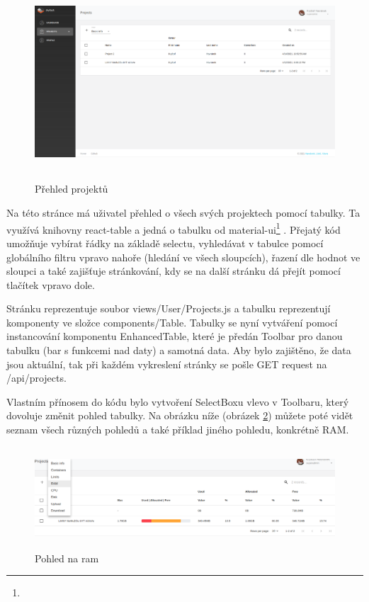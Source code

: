 \documentclass[a4paper,oneside,12pt]{report}
\begin{document}
\begin{figure}[h]
	\centering
	\includegraphics[height=7.3cm]{../img/projectsOverview.png}
	\caption[Přehled projektů, vlastní tvorba]{Přehled projektů}
	\label{fig:projectOverview}
\end{figure}


Na této stránce má uživatel přehled o všech svých projektech pomocí tabulky.
Ta využívá knihovny react-table a jedná o tabulku od material-ui\footnote{} .
Přejatý kód umožňuje vybírat řádky na základě selectu, vyhledávat v tabulce pomocí globálního filtru vpravo nahoře (hledání ve všech sloupcích), řazení dle hodnot ve sloupci a také zajišťuje stránkování, kdy se na další stránku dá přejít pomocí tlačítek vpravo dole.

Stránku reprezentuje soubor views/User/Projects.js a tabulku reprezentují komponenty ve složce components/Table.
Tabulky se nyní vytváření pomocí instancování komponentu EnhancedTable, které je předán Toolbar pro danou tabulku (bar s funkcemi nad daty) a samotná data.
Aby bylo zajištěno, že data jsou aktuální, tak při každém vykreslení stránky se pošle GET request na /api/projects.

Vlastním přínosem do kódu bylo vytvoření SelectBoxu vlevo v Toolbaru, který dovoluje změnit pohled tabulky. Na obrázku níže (obrázek \ref{fig:ram}) můžete poté vidět seznam všech různých pohledů a také příklad jiného pohledu, konkrétně RAM.
\newpage
\begin{figure}[h]
	\centering
	\includegraphics[height=3.8cm]{../img/ram.png}
	\caption[Pohled na ram, vlastní tvorba]{Pohled na ram}
	\label{fig:ram}
\end{figure}
\end{document}

